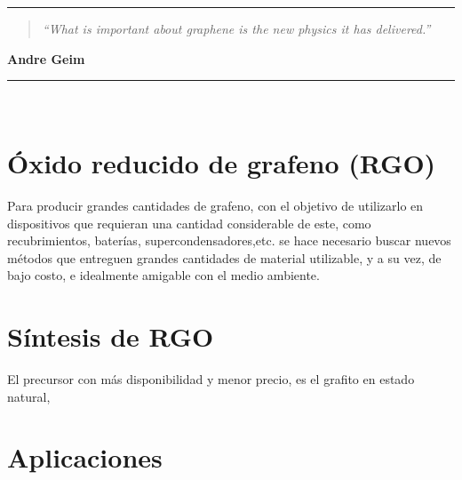 \noindent
\rule{\linewidth}{1 pt}
\begin{flushright}
	\begin{quotation}
		\small{
			\textit{``What is important about graphene is the new physics it has delivered.''}}
	\end{quotation}
	\bf{Andre Geim}
\end{flushright}
\noindent
\rule{\linewidth}{1 pt}\\
\vfill

\section{Óxido reducido de grafeno (RGO)}
Para producir grandes cantidades de grafeno, con el objetivo de utilizarlo en dispositivos que requieran una cantidad considerable de este, como recubrimientos, baterías, supercondensadores,etc. se hace necesario buscar nuevos métodos que entreguen grandes cantidades de material utilizable, y a su vez, de bajo costo, e idealmente amigable con el medio ambiente. 
\section{Síntesis de RGO}
El precursor con más disponibilidad y menor precio, es el grafito en estado natural, 

\section{Aplicaciones}
